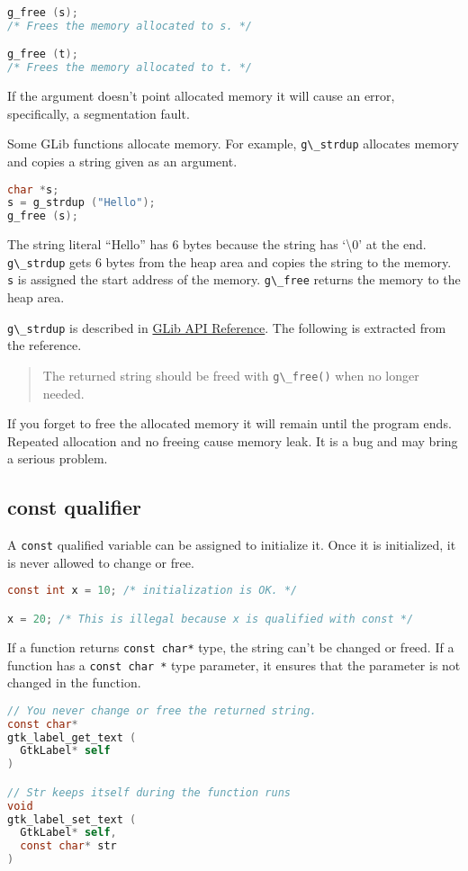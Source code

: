 \begin{lstlisting}[language=C]
g_free (s);
/* Frees the memory allocated to s. */

g_free (t);
/* Frees the memory allocated to t. */
\end{lstlisting}

If the argument doesn't point allocated memory it will cause an error,
specifically, a segmentation fault.

Some GLib functions allocate memory. For example,
\passthrough{\lstinline!g\_strdup!} allocates memory and copies a string
given as an argument.

\begin{lstlisting}[language=C]
char *s;
s = g_strdup ("Hello");
g_free (s);
\end{lstlisting}

The string literal ``Hello'' has 6 bytes because the string has
`\textbackslash0' at the end. \passthrough{\lstinline!g\_strdup!} gets 6
bytes from the heap area and copies the string to the memory.
\passthrough{\lstinline!s!} is assigned the start address of the memory.
\passthrough{\lstinline!g\_free!} returns the memory to the heap area.

\passthrough{\lstinline!g\_strdup!} is described in
\href{https://docs.gtk.org/glib/func.strdup.html}{GLib API Reference}.
The following is extracted from the reference.

\begin{quote}
The returned string should be freed with
\passthrough{\lstinline!g\_free()!} when no longer needed.
\end{quote}

If you forget to free the allocated memory it will remain until the
program ends. Repeated allocation and no freeing cause memory leak. It
is a bug and may bring a serious problem.

\subsection{const qualifier}\label{const-qualifier}

A \passthrough{\lstinline!const!} qualified variable can be assigned to
initialize it. Once it is initialized, it is never allowed to change or
free.

\begin{lstlisting}[language=C]
const int x = 10; /* initialization is OK. */

x = 20; /* This is illegal because x is qualified with const */
\end{lstlisting}

If a function returns \passthrough{\lstinline!const char*!} type, the
string can't be changed or freed. If a function has a
\passthrough{\lstinline!const char *!} type parameter, it ensures that
the parameter is not changed in the function.

\begin{lstlisting}[language=C]
// You never change or free the returned string.
const char*
gtk_label_get_text (
  GtkLabel* self
)

// Str keeps itself during the function runs
void
gtk_label_set_text (
  GtkLabel* self,
  const char* str
)
\end{lstlisting}
